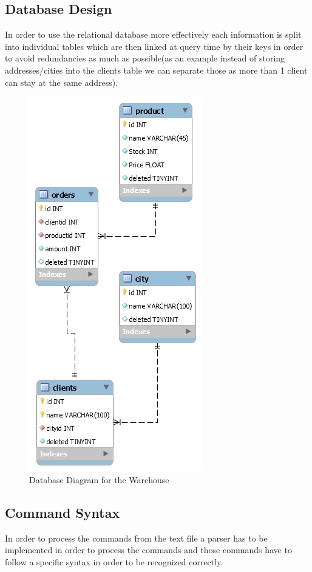 \documentclass[10pt,a4paper]{article}
\begin{document}
\subsection{Database Design}
In order to use the relational database more effectively each information is split into individual tables which are then linked at query time by their keys in order to avoid redundancies as much as possible(as an example instead of storing addresses/cities into the clients table we can separate those as more than 1 client can stay at the same address).\par
\begin{figure}[!htb]
\centering
\includegraphics[scale=0.50]{DBModel.png}
\caption{Database Diagram for the Warehouse}
\end{figure}
\FloatBarrier
\pagebreak
\subsection{Command Syntax}
In order to process the commands from the text file a parser has to be implemented in order to process the commands and those commands have to follow a specific syntax in order to be recognized correctly.
\end{document}

